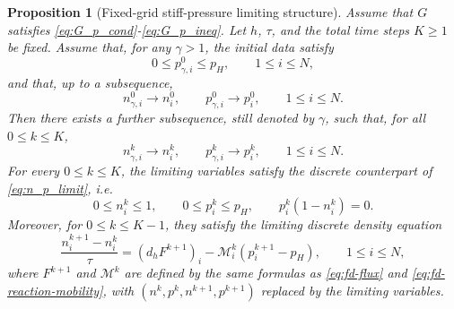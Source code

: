 \documentclass[11pt]{article}
\theoremstyle{plain}
\numberwithin{equation}{section}
\newtheorem{proposition}{Proposition}[section]
\begin{document}
\begin{proposition}[Fixed-grid stiff-pressure limiting structure]
\label{prop:fixed-grid-ap-structure}
Assume that $G$ satisfies \eqref{eq:G_p_cond}-\eqref{eq:G_p_ineq}. Let \(h\), \(\tau\), and the total time steps 
\(K\ge1\) be fixed. 
Assume that, for any $\gamma>1$, the initial data satisfy
\[
    0\le p_{\gamma,i}^0\le p_H,
    \qquad 1\le i\le N,
\]
and that, up to a subsequence,
\[
    n_{\gamma,i}^{0}\to n_i^0,
    \qquad
    p_{\gamma,i}^{0}\to p_i^0,
    \qquad 1\le i\le N .
\]
Then there exists a further subsequence, still denoted by \(\gamma\), such
that, for all \(0\le k\le K\),
\[
    n_{\gamma,i}^{k}\to n_i^k,
    \qquad
    p_{\gamma,i}^{k}\to p_i^k,
    \qquad 1\le i\le N .
\]
For every \(0\le k\le K\), the limiting variables satisfy the discrete counterpart  of \eqref{eq:n_p_limit}, i.e.
\begin{equation}
    0\le n_i^{k}\le1,
    \qquad
    0\le p_i^{k}\le p_H,
    \qquad
    p_i^{k}(1-n_i^{k})=0 .
\label{eq:limit-density-pressure-complementarity}
\end{equation}
Moreover, for \(0\le k\le K-1\), they satisfy the limiting discrete density
equation
\begin{equation}
    \frac{n_i^{k+1}-n_i^{k}}{\tau}
    =
    (d_hF^{k+1})_i
    -
    \mathcal M_i^k
    \left(p_i^{k+1}-p_H\right),
    \qquad 1\le i\le N,
\label{eq:limit-density-balance}
\end{equation}
where \(F^{k+1}\) and \(\mathcal M^k\) are defined by the same formulas as
\eqref{eq:fd-flux} and \eqref{eq:fd-reaction-mobility}, with
\((n^k,p^k,n^{k+1},p^{k+1})\) replaced by the limiting variables. 
\end{proposition}
\end{document}
